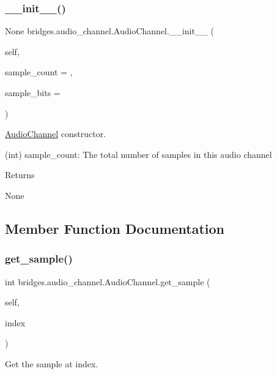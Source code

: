 \subsubsection{\texorpdfstring{\_\_init\_\_()}{\_\_init\_\_()}}
{\footnotesize\ttfamily  None bridges.\+audio\+\_\+channel.\+Audio\+Channel.\+\_\+\+\_\+init\+\_\+\+\_\+ (\begin{DoxyParamCaption}\item[{}]{self,  }\item[{int}]{sample\+\_\+count = {},  }\item[{int}]{sample\+\_\+bits = {} }\end{DoxyParamCaption})}



\mbox{\hyperlink{classbridges_1_1audio__channel_1_1_audio_channel}{Audio\+Channel}} constructor. 

\begin{DoxyVerb}           (int) sample_count: The total number of samples in this audio channel
\end{DoxyVerb}
 \begin{DoxyReturn}{Returns}


None 
\end{DoxyReturn}


\subsection{Member Function Documentation}
\mbox{\label{classbridges_1_1audio__channel_1_1_audio_channel_a092c000cf26061418b9c9016c32e231d}} 
\subsubsection{\texorpdfstring{get\_sample()}{get\_sample()}}
{\footnotesize\ttfamily  int bridges.\+audio\+\_\+channel.\+Audio\+Channel.\+get\+\_\+sample (\begin{DoxyParamCaption}\item[{}]{self,  }\item[{int}]{index }\end{DoxyParamCaption})}



Get the sample at index. 

